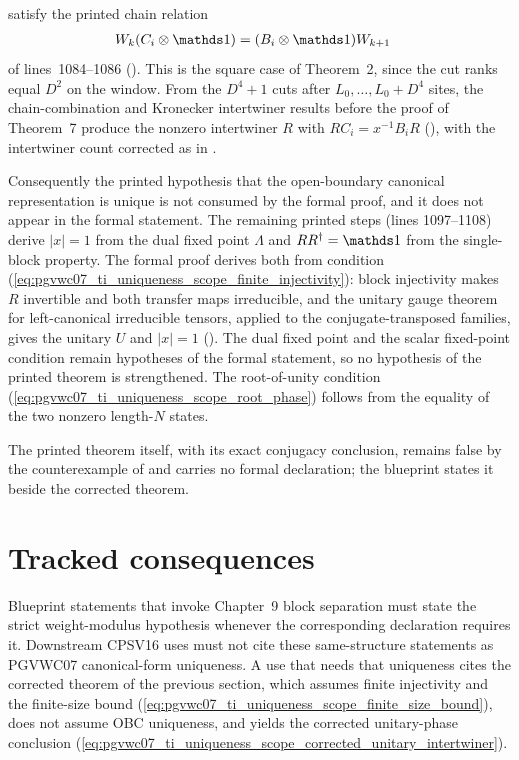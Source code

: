 \documentclass[11pt]{article}
\begin{document}
satisfy the printed chain relation
\begin{align}
    W_k(C_i\otimes\Id)
     & =(B_i\otimes\Id)W_{k+1}
    \label{eq:pgvwc07_ti_uniqueness_scope_chain_relation}
\end{align}
of lines~1084--1086 (). This is the square
case of Theorem~2, since the cut ranks equal $D^2$ on the window. From the
$D^4+1$ cuts after $L_0,\ldots,L_0+D^4$ sites, the chain-combination and
Kronecker intertwiner results before the proof of Theorem~7 produce the
nonzero intertwiner $R$ with $RC_i=x^{-1}B_iR$
(), with the
intertwiner count corrected as in
.

Consequently the printed hypothesis that the open-boundary canonical
representation is unique is not consumed by the formal proof, and it does
not appear in the formal statement. The remaining printed steps (lines
1097--1108) derive $|x|=1$ from the dual fixed point $\Lambda$ and
$RR^\dagger=\Id$ from the single-block property. The formal proof derives
both from condition
(\ref{eq:pgvwc07_ti_uniqueness_scope_finite_injectivity}): block injectivity
makes $R$ invertible and both transfer maps irreducible, and the unitary
gauge theorem for left-canonical irreducible tensors, applied to the
conjugate-transposed families, gives the unitary $U$ and $|x|=1$
().
The dual fixed point and the scalar fixed-point condition remain hypotheses
of the formal statement, so no hypothesis of the printed theorem is
strengthened. The root-of-unity condition
(\ref{eq:pgvwc07_ti_uniqueness_scope_root_phase}) follows from the equality
of the two nonzero length-$N$ states.

The printed theorem itself, with its exact conjugacy conclusion, remains
false by the counterexample of
 and
carries no formal declaration; the blueprint states it beside the corrected
theorem.

\section{Tracked consequences}

Blueprint statements that invoke Chapter~9 block separation must state the
strict weight-modulus hypothesis whenever the corresponding \Lean{}
declaration requires it. Downstream CPSV16 uses must not cite these
same-structure statements as PGVWC07 canonical-form uniqueness. A use that
needs that uniqueness cites the corrected theorem of the previous section,
which assumes finite injectivity and the finite-size bound
(\ref{eq:pgvwc07_ti_uniqueness_scope_finite_size_bound}), does not assume OBC
uniqueness, and yields the corrected unitary-phase conclusion
(\ref{eq:pgvwc07_ti_uniqueness_scope_corrected_unitary_intertwiner}).



\end{document}
